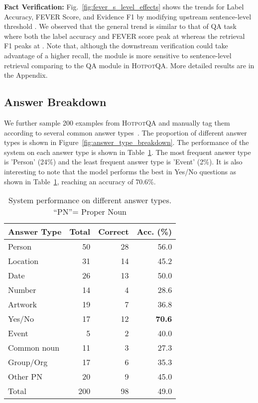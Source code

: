 \documentclass[11pt,a4paper]{article}
\newcommand\fever{FEVER\xspace}
\newcommand\hpqa{\textsc{HotpotQA}\xspace}
\begin{document}
\noindent \textbf{Fact Verification:}
Fig.~\ref{fig:fever_s_level_effects} shows the trends for Label Accuracy, \fever Score, and Evidence F1 by modifying upstream sentence-level threshold . We observed that the general trend is similar to that of QA task where both the label accuracy and \fever score peak at  whereas the retrieval F1 peaks at . Note that, although the downstream verification could take advantage of a higher recall, the module is more sensitive to sentence-level retrieval comparing to the QA module in \hpqa. More detailed results are in the Appendix.

\subsection{Answer Breakdown}
We further sample 200 examples from \hpqa and manually tag them according to several common answer types~\cite{yang2018hotpotqa}. The proportion of different answer types is shown in Figure~\ref{fig:answer_type_breakdown}. The performance of the system on each answer type is shown in Table~\ref{tab:answer_breakdown_performance}. The most frequent answer type is 'Person' (24\%) and the least frequent answer type is 'Event' (2\%). It is also interesting to note that the model performs the best in Yes/No questions as shown in Table~\ref{tab:answer_breakdown_performance}, reaching an accuracy of 70.6\%.


\begin{table}[t]
\centering
\begin{tabular}{lrrr}
\toprule
Answer Type & Total & Correct & Acc. (\%)\\
\midrule
Person & 50 & 28 & 56.0 \\
Location & 31 & 14 & 45.2 \\
Date & 26 & 13 & 50.0 \\
Number & 14 & 4 & 28.6 \\
Artwork & 19 & 7 & 36.8 \\
Yes/No & 17 & 12 & \bf{70.6} \\
Event & 5 & 2 & 40.0 \\
Common noun & 11 & 3 & 27.3 \\
Group/Org & 17 & 6 & 35.3 \\
Other PN & 20 & 9 & 45.0 \\
\midrule
Total & 200 & 98 & 49.0 \\
\bottomrule
\end{tabular}
\caption{System performance on different answer types. ``PN''= Proper Noun}
\label{tab:answer_breakdown_performance}
\vspace{-5pt}
\end{table}
\end{document}
